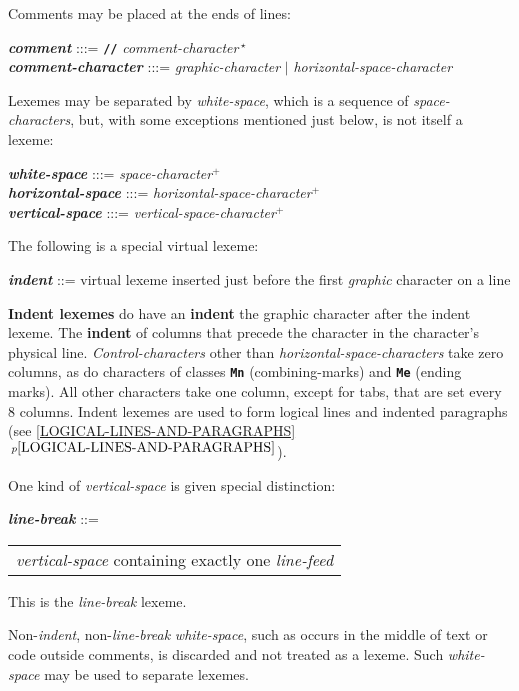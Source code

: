 \documentclass[12pt]{article}
\newcommand{\TT}[1]{{\tt \bfseries #1}}
\newcommand{\key}[1]{{\rm \bfseries #1}}
\newcommand{\emkey}[1]{{\em \bfseries #1}}
\newcommand{\itemref}[1]{\ref{#1}$\,^{p\pageref{#1}}$}
\newcommand{\PLUS}[1][]{{$^{+#1}$}}
\newenvironment{indpar}[1][0.3in]%
	{\begin{list}{}%
		     {\setlength{\itemsep}{0in}%
		      \setlength{\topsep}{0in}%
		      \setlength{\parsep}{1ex}%
		      \setlength{\labelwidth}{#1}%
		      \setlength{\leftmargin}{#1}%
		      \addtolength{\leftmargin}{\labelsep}}%
	 \item}%
	{\end{list}}
\begin{document}
Comments may be placed at the ends of lines:
\begin{indpar}
\emkey{comment}\label{COMMENT} :::=
    \TT{//} {\em comment-character}\,$^\star$
\\[1ex]
\emkey{comment-character} :::= {\em graphic-character}
                          $|$ {\em horizontal-space-character}
\end{indpar}

Lexemes may be separated by {\em white-space}, which
is a sequence of {\em space-characters},
but, with some exceptions mentioned just below, is not itself a lexeme:
\begin{indpar}
\emkey{white-space} :::= {\em space-character}\PLUS{}
\\[0.3ex]
\emkey{horizontal-space} :::= {\em horizontal-space-character}\PLUS{}
\\[0.3ex]
\emkey{vertical-space} :::= {\em vertical-space-character}\PLUS{}
\end{indpar}

The following is a special virtual lexeme:
\begin{indpar}
\emkey{indent}\label{INDENT} ::=
        virtual lexeme inserted just before the first
	{\em graphic} character on a line
\end{indpar}

\key{Indent lexemes}
do have an \key{indent}
the graphic character after the indent lexeme.
The \key{indent}
of columns that precede the character in the character's physical line.
{\em Control-characters} other than {\em horizontal-space-characters}
take zero columns, as do characters of classes \TT{Mn} (combining-marks)
and \TT{Me} (ending marks).  All other characters take one column,
except for tabs, that are set every 8 columns.
Indent lexemes are used to form logical lines and indented paragraphs
(see \itemref{LOGICAL-LINES-AND-PARAGRAPHS}).

One kind of {\em vertical-space} is given special distinction:
\begin{indpar}
\emkey{line-break}\label{LINE-BREAK} ::=
	\begin{tabular}[t]{l}
        {\em vertical-space} containing exactly one {\em line-feed}
	\end{tabular}
\end{indpar}

This is the {\em line-break} lexeme.

Non-{\em indent}, non-{\em line-break} {\em white-space}, such as occurs
in the middle of text or code outside comments, is discarded and not treated
as a lexeme.  Such {\em white-space} may be used to separate lexemes.
\end{document}
